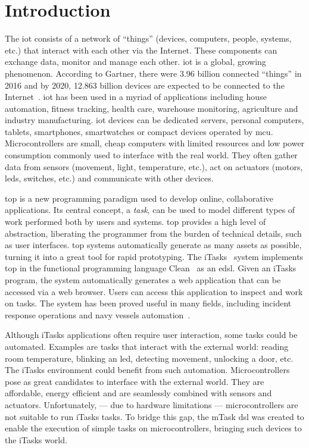 \section{Introduction}
The \ac{iot} consists of a network of ``things'' (devices, computers, people, systems, etc.) that interact with each other via the Internet. These components can exchange data, monitor and manage each other. \ac{iot} is a global, growing phenomenon. According to Gartner, there were 3.96 billion connected ``things'' in 2016 and by 2020, 12.863 billion devices are expected to be connected to the Internet~\cite{iot_numbers}. \ac{iot} has been used in a myriad of applications including house automation, fitness tracking, health care, warehouse monitoring, agriculture and industry manufacturing. \ac{iot} devices can be dedicated servers, personal computers, tablets, smartphones, smartwatches or compact devices operated by \ac{mcu}. Microcontrollers are small, cheap computers with limited resources and low power consumption commonly used to interface with the real world. They often gather data from sensors (movement, light, temperature, etc.), act on actuators (motors, \acsp{led}, switches, etc.) and communicate with other devices.

\ac{top} is a new programming paradigm used to develop online, collaborative applications. Its central concept, a \textit{task}, can be used to model different types of work performed both by users and systems. \ac{top} provides a high level of abstraction, liberating the programmer from the burden of technical details, such as user interfaces. \ac{top} systems automatically generate as many assets as possible, turning it into a great tool for rapid prototyping. The iTasks~\cite{top} system implements \ac{top} in the functional programming language Clean~\cite{clean} as an \ac{edsl}. Given an iTasks program, the system automatically generates a web application that can be accessed via a web browser. Users can access this application to inspect and work on tasks. The system has been proved useful in many fields, including incident response operations and navy vessels automation~\cite{incidone,navy}.

Although iTasks applications often require user interaction, some tasks could be automated. Examples are tasks that interact with the external world: reading room temperature, blinking an \acs{led}, detecting movement, unlocking a door,  etc. The iTasks environment could benefit from such automation. Microcontrollers pose as great candidates to interface with the external world. They are affordable, energy efficient and are seamlessly combined with sensors and actuators. Unfortunately, --- due to hardware limitations --- microcontrollers are not suitable to run iTasks tasks. To bridge this gap, the mTask \ac{dsl} was created to enable the execution of simple tasks on microcontrollers, bringing such devices to the iTasks world.


